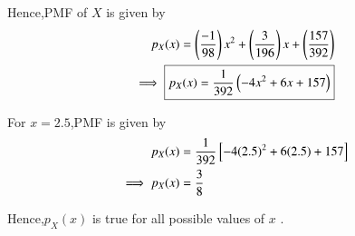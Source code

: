 \documentclass[journal,12pt,twocolumn]{IEEEtran}
\begin{document}
Hence,PMF of $X$ is given by 
\begin{align}
    p_{X}(x) = \left(\frac{-1}{98}\right)x^2 + \left(\frac{3}{196}\right)x + \left(\frac{157}{392}\right) \\
    \implies  \boxed{p_{X}(x) = \frac{1}{392}\left(-4x^2+6x+157\right)}
\end{align}

For $x=2.5$,PMF is given by
\begin{align}
    p_{X}(x) &= \frac{1}{392}{}\left[-4(2.5)^2+6(2.5)+157\right] \\
    \implies p_{X}(x) &= \frac{3}{8}
\end{align}

Hence,$p_{X}(x)$ is true for all possible values of $x$ .
\end{document}
